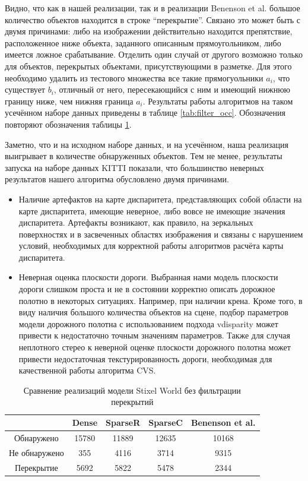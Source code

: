 \documentclass[aps,%
14pt,%
final,%
oneside,
onecolumn,%
musixtex, %
superscriptaddress,%
centertags]{extarticle} %
\begin{document}
Видно, что как в нашей реализации, так и в реализации Benenson et al. большое количество объектов находится в строке ``перекрытие''. Связано это может быть с двумя причинами: либо на изображении действительно находится препятствие, расположенное ниже объекта, заданного описанным прямоугольником, либо имеется ложное срабатывание. Отделить один случай от другого возможно только для объектов, перекрытых объектами, присутствующими в разметке. Для этого необходимо удалить из тестового множества все такие прямогуольники $a_i$, что существует $b_i$, отличный от него, пересекающийся с ним и имеющий нижнюю границу ниже, чем нижняя граница $a_i$. Результаты работы алгоритмов на таком усечённом наборе данных приведены в таблице \ref{tab:filter_occ}. Обозначения повторяют обозначения таблицы \ref{tab:no_filter_occ}.

Заметно, что и на исходном наборе данных, и на усечённом, наша реализация выигрывает в количестве обнаруженных объектов. Тем не менее, результаты запуска на наборе данных KITTI показали, что большинство неверных результатов нашего алгоритма обусловлено двумя причинами.
\begin{itemize}
\item Наличие артефактов на карте диспаритета, представляющих собой области на карте диспаритета, имеющие неверное, либо вовсе не имеющие значения диспаритета. Артефакты возникают, как правило, на зеркальных поверхностях и в засвеченных областях изображения и связаны с нарушением условий, необходимых для корректной работы алгоритмов расчёта карты диспаритета. 
\item Неверная оценка плоскости дороги. Выбранная нами модель плоскости дороги слишком проста и не в состоянии корректно описать дорожное полотно в некоторых ситуациях. Например, при наличии крена. Кроме того, в виду наличия большого количества объектов на сцене, подбор параметров модели дорожного полотна с использованием подхода vdisparity может привести к недостаточно точным значениям параметров. Также для случая неплотного стерео к неверной оценке плоскости дорожного полотна может привести недостаточная текстурированность дороги, необходимая для качественной работы алгоритма CVS.
\end{itemize}

\begin{table}
\center
\begin{tabular}{|c|c|c|c|c|}
\hline
	 & Dense & SparseR & SparseC & Benenson et al. \\
\hline
	Обнаружено 			& 15780 & 11889 & 12635 & 10168\\
\hline
	Не обнаружено 		& 355   & 4116  & 3714 & 9315\\
\hline
	Перекрытие			& 5692  & 5822  & 5478 & 2344\\
\hline
\end{tabular}
\caption{Сравнение реализаций модели Stixel World без фильтрации перекрытий}
\label{tab:no_filter_occ}
\end{table}
\end{document}

